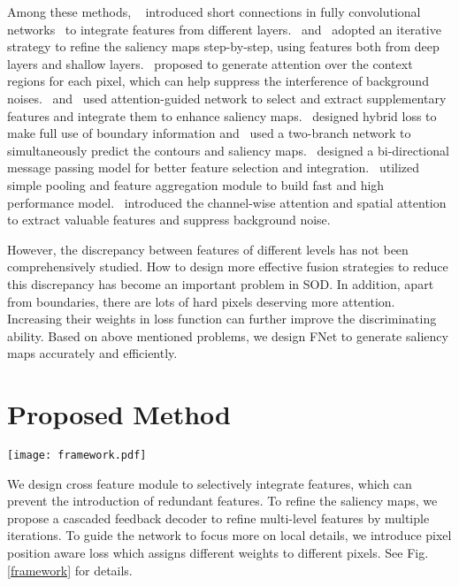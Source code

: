 \documentclass[letterpaper]{article} \usepackage{aaai20}  \usepackage{times}  \usepackage{helvet} \usepackage{courier}  \usepackage[hyphens]{url}  \usepackage{graphicx} \urlstyle{rm} \def\UrlFont{\rm}  \usepackage{graphicx}  \frenchspacing  \setlength{\pdfpagewidth}{8.5in}  \setlength{\pdfpageheight}{11in}
\begin{document}
Among these methods, ~\cite{DSS} introduced short connections in fully convolutional networks~\cite{FCN} to integrate features from different layers.~\cite{R3Net} and~\cite{SRM} adopted an iterative strategy to refine the saliency maps step-by-step, using features both from deep layers and shallow layers.~\cite{PiCANet} proposed to generate attention over the context regions for each pixel, which can help suppress the interference of background noises.~\cite{RAS} and~\cite{PAGR} used attention-guided network to select and extract supplementary features and integrate them to enhance saliency maps.~\cite{BASNet} designed hybrid loss to make full use of boundary information and~\cite{AFNet} used a two-branch network to simultaneously predict the contours and saliency maps.~\cite{BMPM} designed a bi-directional message passing model for better feature selection and integration.~\cite{PoolNet} utilized simple pooling and feature aggregation module to build fast and high performance model.~\cite{PFAN} introduced the channel-wise attention and spatial attention to extract valuable features and suppress background noise.

However, the discrepancy between features of different levels has not been comprehensively studied. How to design more effective fusion strategies to reduce this discrepancy has become an important problem in SOD. In addition, apart from boundaries, there are lots of hard pixels deserving more attention. Increasing their weights in loss function can further improve the discriminating ability. Based on above mentioned problems, we design FNet to generate saliency maps accurately and efficiently.


\section{Proposed Method}
\begin{figure*}[htb]
  \centering
  \texttt{[image: framework.pdf]}
  \caption{An overview of proposed FNet. ResNet-50 is used as the backbone encoder. Cross feature module (CFM) is used as the basic module to fuse features of different layers. Cascaded feedback decoder (CFD) contains multiple sub-decoders to feedback and refine multi-level features. Multi-level supervision (MLS) helps to ease the optimization of FNet.}
  \label{framework}
\end{figure*}

We design cross feature module to selectively integrate features, which can prevent the introduction of redundant features. To refine the saliency maps, we propose a cascaded feedback decoder to refine multi-level features by multiple iterations. To guide the network to focus more on local details, we introduce pixel position aware loss which assigns different weights to different pixels. See Fig.\ref{framework} for details. 
\end{document}

